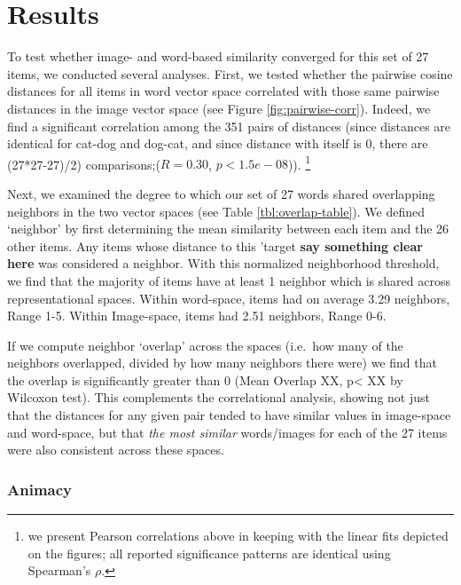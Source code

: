 \documentclass[10pt, letterpaper]{article}
\begin{document}
\section{Results}\label{results}

To test whether image- and word-based similarity converged for this set
of 27 items, we conducted several analyses. First, we tested whether the
pairwise cosine distances for all items in word vector space correlated
with those same pairwise distances in the image vector space (see Figure
\ref{fig:pairwise-corr}). Indeed, we find a significant correlation
among the 351 pairs of distances (since distances are identical for
cat-dog and dog-cat, and since distance with itself is 0, there are
(27*27-27)/2) comparisons;(\(R = 0.30\), \(p < 1.5e-08\))).
\footnote{we present Pearson correlations above in keeping with the linear fits depicted on the figures; all reported significance patterns are identical using Spearman's $\rho$.}

Next, we examined the degree to which our set of 27 words shared
overlapping neighbors in the two vector spaces (see Table
\ref{tbl:overlap-table}). We defined `neighbor' by first determining the
mean similarity between each item and the 26 other items. Any items
whose distance to this 'target \textbf{say something clear here} was
considered a neighbor. With this normalized neighborhood threshold, we
find that the majority of items have at least 1 neighbor which is shared
across representational spaces. Within word-space, items had on average
3.29 neighbors, Range 1-5. Within Image-space, items had 2.51 neighbors,
Range 0-6.

If we compute neighbor `overlap' across the spaces (i.e.~how many of the
neighbors overlapped, divided by how many neighbors there were) we find
that the overlap is significantly greater than 0 (Mean Overlap XX,
p\textless{} XX by Wilcoxon test). This complements the correlational
analysis, showing not just that the distances for any given pair tended
to have similar values in image-space and word-space, but that
\textit{the most similar} words/images for each of the 27 items were
also consistent across these spaces.

\subsubsection{Animacy}\label{animacy}
\end{document}
